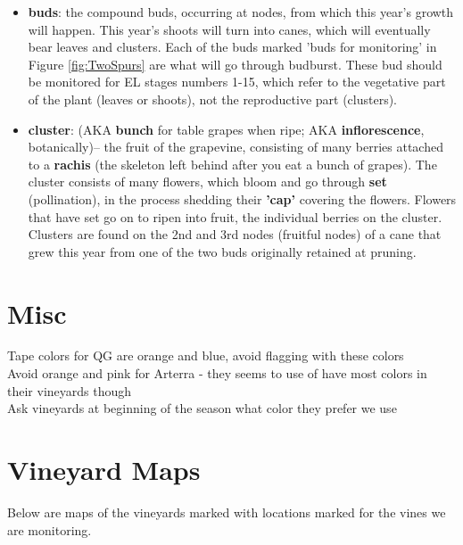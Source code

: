 \documentclass[11pt,letter]{article}
\newenvironment{smitemize}{
\begin{itemize}
  \setlength{\itemsep}{0pt}
  \setlength{\parskip}{0.8pt}
  \setlength{\parsep}{0pt}}
{\end{itemize}
}
\begin{document}
\begin{smitemize}
\item {\bf buds}: the compound buds, occurring at nodes, from which this year's growth will happen. This year's shoots will turn into canes, which will eventually bear leaves and clusters. Each of the buds marked 'buds for monitoring' in Figure \ref{fig:TwoSpurs} are what will go through budburst. These bud should be monitored for EL stages numbers 1-15, which refer to the vegetative part of the plant (leaves or shoots), not the reproductive part (clusters). 
\item {\bf cluster}: (AKA {\bf bunch} for table grapes when ripe; AKA {\bf inflorescence}, botanically)-- the fruit of the grapevine, consisting of many berries attached to a {\bf rachis} (the skeleton left behind after you eat a bunch of grapes). The cluster consists of many flowers, which bloom and go through {\bf set} (pollination), in the process shedding their {\bf 'cap'} covering the flowers. Flowers that have set go on to ripen into fruit, the individual berries on the cluster. Clusters are found on the 2nd and 3rd nodes (fruitful nodes) of a cane that grew this year from one of the two buds originally retained at pruning.
\end{smitemize}


\section{Misc}
Tape colors for QG are orange and blue, avoid flagging with these colors\\
Avoid orange and pink for Arterra - they seems to use of have most colors in their vineyards though\\
Ask vineyards at beginning of the season what color they prefer we use

\clearpage
\section{Vineyard Maps}
Below are maps of the vineyards marked with locations marked for the vines we are monitoring.
\end{document}
